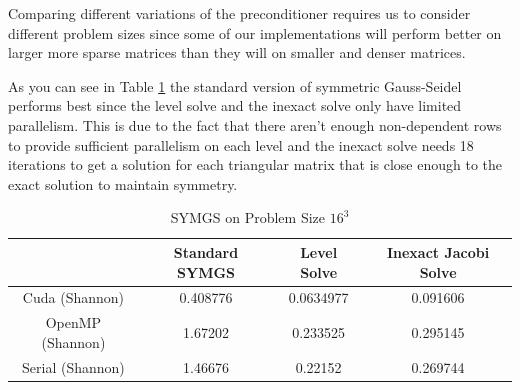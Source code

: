 \documentclass{ccr15}
\begin{document}

Comparing different variations of the preconditioner requires us to consider different problem sizes
since some of our implementations will perform better on larger more sparse matrices than they will
on smaller and denser matrices. 

As you can see in Table \ref{SYMGS16} the standard version of symmetric Gauss-Seidel performs
best since the level solve and the inexact solve only have limited parallelism. This is due to
the fact that there aren't enough non-dependent rows to provide sufficient parallelism on each
level and the inexact solve needs 18 iterations to get a solution for each triangular matrix that
is close enough to the exact solution to maintain symmetry.

\begin{table}[h]
\begin{center}
\begin{tabular}{|c||c|c|c|}
\hline
 & Standard SYMGS & Level Solve & Inexact Jacobi Solve \\
 \hline \hline
 Cuda (Shannon) & 0.408776 & 0.0634977 & 0.091606 \\
 \hline
 OpenMP (Shannon) & 1.67202 & 0.233525 & 0.295145 \\
 \hline
 Serial (Shannon) & 1.46676 & 0.22152 & 0.269744 \\
 \hline
\end{tabular}
\caption{SYMGS on Problem Size $16^3$}
\label{SYMGS16}
\end{center}
\end{table}
\end{document}
